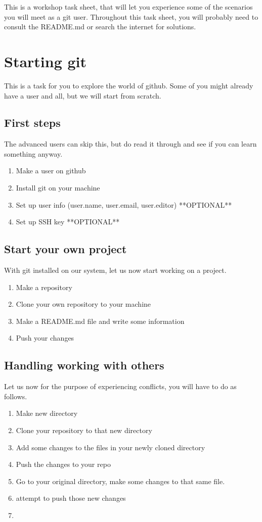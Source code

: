 \documentclass[12 pt,a4paper]{article}
\newcommand{\Fin}{
\vfill
\begin{center}
\textit{ }\label{FIN}
\end{center}}
\begin{document}
\noindent This is a workshop task sheet, 
that will let you experience some of the scenarios you will meet as a git user.
Throughout this task sheet,
you will probably need to consult the README.md or search the internet for solutions.

\section*{Starting git}
This is a task for you to explore the world of github.
Some of you might already have a user and all, 
but we will start from scratch.

\subsection*{First steps}
The advanced users can skip this,
but do read it through and see if you can learn something anyway.
\begin{enumerate}
  \item Make a user on github
  \item Install git on your machine
  \item Set up user info (user.name, user.email, user.editor) **OPTIONAL**
  \item Set up SSH key **OPTIONAL**
\end{enumerate}

\subsection*{Start your own project}
With git installed on our system, let us now start working on a project.
\begin{enumerate}
\item Make a repository
\item Clone your own repository to your machine
\item Make a README.md file and write some information
\item Push your changes
\end{enumerate}

\subsection*{Handling working with others}
Let us now for the purpose of experiencing conflicts, you will have to do as follows.

\begin{enumerate}
\item Make new directory
\item Clone your repository to that new directory
\item Add some changes to the files in your newly cloned directory
\item Push the changes to your repo
\item Go to your original directory, make some changes to that same file.
\item attempt to push those new changes
\item 
\end{enumerate}

\Fin
\end{document}
